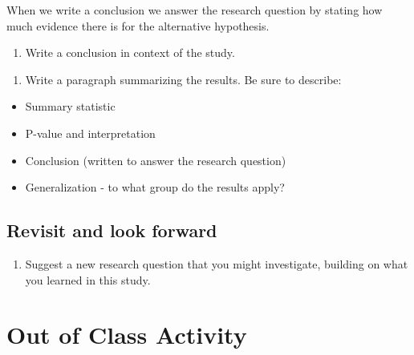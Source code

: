 \documentclass[
]{report}
\providecommand{\tightlist}{%
  \setlength{\itemsep}{0pt}\setlength{\parskip}{0pt}}
\begin{document}
When we write a conclusion we answer the research question by stating how much evidence there is for the alternative hypothesis.

\begin{enumerate}
\def\labelenumi{\arabic{enumi}.}
\setcounter{enumi}{24}
\tightlist
\item
  Write a conclusion in context of the study.
\end{enumerate}

\vspace{1in}

\begin{enumerate}
\def\labelenumi{\arabic{enumi}.}
\setcounter{enumi}{25}
\tightlist
\item
  Write a paragraph summarizing the results. Be sure to describe:
\end{enumerate}

\begin{itemize}
\item
  Summary statistic
\item
  P-value and interpretation
\item
  Conclusion (written to answer the research question)
\item
  Generalization - to what group do the results apply?
\end{itemize}

\vspace{3in}

\hypertarget{revisit-and-look-forward}{%
\subsection*{Revisit and look forward}\label{revisit-and-look-forward}}

\begin{enumerate}
\def\labelenumi{\arabic{enumi}.}
\setcounter{enumi}{26}
\tightlist
\item
  Suggest a new research question that you might investigate, building on what you learned in this study.
\end{enumerate}

\vspace{.6in}

\hypertarget{out-of-class-activity}{%
\section{Out of Class Activity}\label{out-of-class-activity}}
\end{document}
